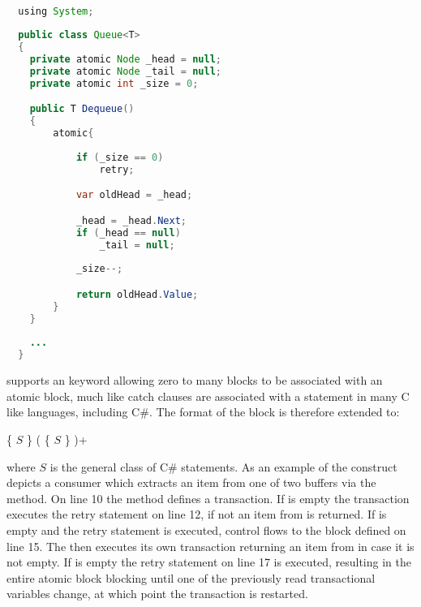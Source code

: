 \begin{lstlisting}[label=lst:stm_atomic_syntax_retry,
  caption={Retry Syntax},
  language=Java,  
  showspaces=false,
  showtabs=false,
  breaklines=true,
  showstringspaces=false,
  breakatwhitespace=true,
  commentstyle=\color{greencomments},
  keywordstyle=\color{bluekeywords},
  stringstyle=\color{redstrings},
  morekeywords={atomic, retry, orElse, var, get, set, using}]  % Start your code-block

  using System;
  
  public class Queue<T>
  {
  	private atomic Node _head = null;
  	private atomic Node _tail = null;
  	private atomic int _size = 0;

  	public T Dequeue()
  	{
  		atomic{
  		
  			if (_size == 0)
  				retry;

  			var oldHead = _head;

  			_head = _head.Next;
  			if (_head == null)
  				_tail = null;
  			
  			_size--;

  			return oldHead.Value;
  		}
  	}
  	
  	...
  }
\end{lstlisting}

\stmnamesp supports an  keyword allowing zero to many  blocks to be associated with an atomic block, much like catch clauses are associated with a  statement in many C like languages, including C\#\cite[p. 96]{sestoft2011c}. The  format of the  block is therefore extended to:

 \{ $S$ \} (  \{ $S$ \} )+

where $S$ is the general class of C\# statements. As an example of the  construct   depicts a consumer which extracts an item from one of two buffers via the  method. On line 10 the  method defines a transaction. If  is empty the transaction executes the retry statement on line 12, if not an item from  is returned. If  is empty and the retry statement is executed, control flows to the  block defined on line 15. The  then executes its own transaction returning an item from  in case it is not empty. If  is empty the retry statement on line 17 is executed, resulting in the entire atomic block blocking until one of the previously read transactional variables change, at which point the transaction is restarted.

